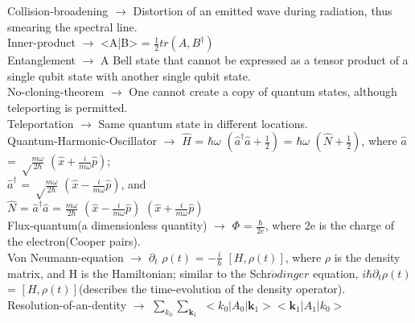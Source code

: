 \documentclass[10pt,fancy]{elegantbook}
\begin{document}
{\begin{definition}
Collision-broadening $\longrightarrow$ Distortion of an emitted wave during radiation, thus smearing the spectral line. \\
 
Inner-product $\longrightarrow$ <A|B> = $\frac{1}{2}tr(A,B^\dagger)$ \\
 
Entanglement $\longrightarrow$ A Bell state that cannot be expressed as a tensor product of a single qubit state with another single qubit state. \\
 
No-cloning-theorem $\longrightarrow$ One cannot create a copy of quantum states, although teleporting is permitted.  \\
  
Teleportation $\longrightarrow$ Same quantum state in different locations.  \\
  
Quantum-Harmonic-Oscillator $\longrightarrow$ $\hat H$ = $\hbar \omega$  $\left(\hat {a}^\dagger \hat {a} + \frac{1}{2} \right)$ = $\hbar \omega$ $\left(\hat N + \frac{1}{2} \right)$, where $\hat {a}$ = ${\sqrt \frac{m \omega}{2 \hbar}}$ $\left( \hat x + \frac{i}{m \omega} \hat p \right)$; \\
$\hat {a}^\dagger$ = ${\sqrt \frac{m \omega}{2 \hbar}}$ $\left( \hat x - \frac{i}{m \omega} \hat p \right)$, and  \\
$\hat N$ = $\hat {a}^\dagger \hat a$ = $\frac{m \omega}{2 \hbar}$ $\left(\hat x - \frac{i}{m \omega} \hat p \right)$ $ \left( \hat x + \frac{i}{m \omega} \hat p \right)$ \\
 
Flux-quantum(a dimensionless quantity) $\longrightarrow$ $\Phi$ = $\frac{\hbar}{2e}$, where 2e is the charge of the electron(Cooper pairs). \\
     
Von Neumann-equation $\longrightarrow$ $\partial_t$ $\rho(t)$ = $- {\frac{i}{\hbar}}$ $[H,\rho(t)]$, where $\rho$ is the density matrix, and H is the Hamiltonian;
similar to the Schr$\ddot{o}dinger$ equation, $i\hbar \partial_t \rho(t)$ = $[H, \rho(t)]$(describes the time-evolution of the density operator).  \\
  
Resolution-of-an-dentity $\longrightarrow$ $\sum_{k_0} \sum_{\mathbf k_1}$ $<k_0|A_0| {\mathbf k_1}><{\mathbf k_1}|A_1|k_0>$ \\


\end{definition}}
\end{document}
